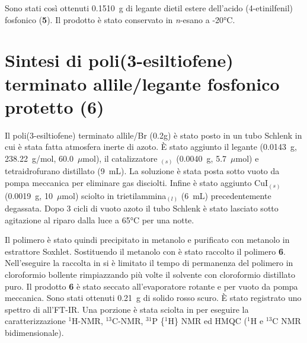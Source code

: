 Sono stati così ottenuti 0.1510~g di legante dietil estere dell'acido (4-etinilfenil) fosfonico ({\bf 5}). Il prodotto è stato conservato in {\itshape n}-esano  a -20°C. 

\section{Sintesi di poli(3-esiltiofene) terminato allile/legante fosfonico protetto (6)}
Il poli(3-esiltiofene) terminato allile/Br  (0.2g) è stato posto in un tubo Schlenk in cui è stata fatta atmosfera inerte di azoto. È stato aggiunto il legante  (0.0143~g, 238.22~g/mol, 60.0~$\mu$mol), il catalizzatore $_{(s)}$ (0.0040~g, 5.7~$\mu$mol) e tetraidrofurano distillato (9~mL).
La soluzione è stata posta sotto vuoto da pompa meccanica per eliminare gas disciolti.
Infine è stato aggiunto CuI$_{(s)}$ (0.0019~g, 10~$\mu$mol) sciolto in trietilammina$_{(l)}$ (6~mL) precedentemente degassata. Dopo 3 cicli di vuoto azoto il tubo Schlenk è stato lasciato sotto agitazione al riparo dalla luce a 65°C per una notte.

Il polimero è stato quindi precipitato in metanolo e purificato con metanolo in estrattore Soxhlet. Sostituendo il metanolo con  è stato raccolto il polimero {\bf 6}. Nell'eseguire la raccolta in  si è limitato il tempo di permanenza del polimero in cloroformio bollente rimpiazzando più volte il solvente con cloroformio distillato puro. Il prodotto {\bf 6} è stato seccato all'evaporatore rotante e per vuoto da pompa meccanica. Sono stati ottenuti 0.21~g di solido rosso scuro. È stato registrato uno spettro di  all'FT-IR\@. Una porzione è stata sciolta in  per eseguire la caratterizzazione $^1$H-NMR, $^{13}$C-NMR, $^{31}$P \{$^1$H\} NMR ed HMQC ($^1$H e $^{13}$C NMR bidimensionale). 


